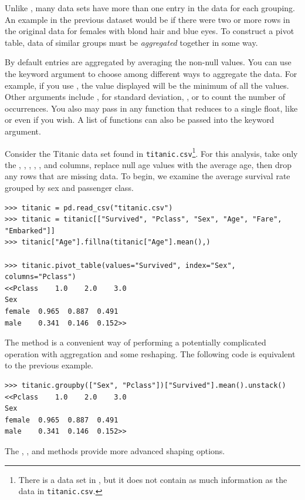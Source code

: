 Unlike , many data sets have more than one entry in the data for each grouping.
An example in the previous dataset would be if there were two or more rows in the original data for females with blond hair and blue eyes.
To construct a pivot table, data of similar groups must be \emph{aggregated} together in some way.

By default entries are aggregated by averaging the non-null values.
You can use the keyword argument  to choose among different ways to aggregate the data.
For example, if you use , the value displayed will be the minimum of all the values.
Other arguments include ,  for standard deviation, , or  to count the number of occurrences.
You also may pass in any function that reduces to a single float, like  or even  if you wish.
A list of functions can also be passed into the  keyword argument.

Consider the Titanic data set found in \texttt{titanic.csv}\footnote{There is a  data set in , but it does not contain as much information as the data in \texttt{titanic.csv}.}.
For this analysis, take only the , , , , , and  columns, replace null age values with the average age, then drop any rows that are missing data.
To begin, we examine the average survival rate grouped by sex and passenger class.

\begin{lstlisting}
>>> titanic = pd.read_csv("titanic.csv")
>>> titanic = titanic[["Survived", "Pclass", "Sex", "Age", "Fare", "Embarked"]]
>>> titanic["Age"].fillna(titanic["Age"].mean(),)

>>> titanic.pivot_table(values="Survived", index="Sex", columns="Pclass")
<<Pclass    1.0    2.0    3.0
Sex
female  0.965  0.887  0.491
male    0.341  0.146  0.152>>
\end{lstlisting}

\begin{info} %
The  method is a convenient way of performing a potentially complicated  operation with aggregation and some reshaping.
The following code is equivalent to the previous example.

\begin{lstlisting}
>>> titanic.groupby(["Sex", "Pclass"])["Survived"].mean().unstack()
<<Pclass    1.0    2.0    3.0
Sex
female  0.965  0.887  0.491
male    0.341  0.146  0.152>>
\end{lstlisting}

The , , and  methods provide more advanced shaping options.
\end{info}

